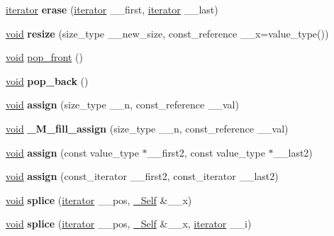 \begin{DoxyCompactItemize}
\hyperlink{structiterator}{iterator} {\bfseries erase} (\hyperlink{structiterator}{iterator} \+\_\+\+\_\+first, \hyperlink{structiterator}{iterator} \+\_\+\+\_\+last)
\item 
\mbox{\label{classlist_aea1ceb3f60a38f66c546bee57ad9fbd9}} 
\hyperlink{interfacevoid}{void} {\bfseries resize} (size\+\_\+type \+\_\+\+\_\+new\+\_\+size, const\+\_\+reference \+\_\+\+\_\+x=value\+\_\+type())
\item 
\hyperlink{interfacevoid}{void} \hyperlink{classlist_a069ca47c58b14e5da576c90240db1f34}{pop\+\_\+front} ()
\item 
\mbox{\label{classlist_a4b47aa424e48c3a3c4570a6fa3bcbb60}} 
\hyperlink{interfacevoid}{void} {\bfseries pop\+\_\+back} ()
\item 
\mbox{\label{classlist_ae339f88eab219c0fb31adb16aa08ad70}} 
\hyperlink{interfacevoid}{void} {\bfseries assign} (size\+\_\+type \+\_\+\+\_\+n, const\+\_\+reference \+\_\+\+\_\+val)
\item 
\mbox{\label{classlist_af54f3f0b8d841b0ae834c295a2a0e213}} 
\hyperlink{interfacevoid}{void} {\bfseries \+\_\+\+M\+\_\+fill\+\_\+assign} (size\+\_\+type \+\_\+\+\_\+n, const\+\_\+reference \+\_\+\+\_\+val)
\item 
\mbox{\label{classlist_a6b2a5e23390d46f8bb152f7aba5d899b}} 
\hyperlink{interfacevoid}{void} {\bfseries assign} (const value\+\_\+type $\ast$\+\_\+\+\_\+first2, const value\+\_\+type $\ast$\+\_\+\+\_\+last2)
\item 
\mbox{\label{classlist_a3e251ec3b65eaeaa17ede8a6d7e98e15}} 
\hyperlink{interfacevoid}{void} {\bfseries assign} (const\+\_\+iterator \+\_\+\+\_\+first2, const\+\_\+iterator \+\_\+\+\_\+last2)
\item 
\mbox{\label{classlist_a2de990150f9cc3b23a52b7d2f9c1712e}} 
\hyperlink{interfacevoid}{void} {\bfseries splice} (\hyperlink{structiterator}{iterator} \+\_\+\+\_\+pos, \hyperlink{classlist}{\+\_\+\+Self} \&\+\_\+\+\_\+x)
\item 
\mbox{\label{classlist_ac096572e90410b2cd1e6b53b6b21eb9a}} 
\hyperlink{interfacevoid}{void} {\bfseries splice} (\hyperlink{structiterator}{iterator} \+\_\+\+\_\+pos, \hyperlink{classlist}{\+\_\+\+Self} \&\+\_\+\+\_\+x, \hyperlink{structiterator}{iterator} \+\_\+\+\_\+i)

\end{DoxyCompactItemize}
